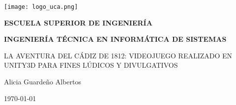 

\begin{titlepage}

  \begin{center}

    \texttt{[image: logo\_uca.png]} \\
    
    \vspace{2.0cm}
    
    \LARGE{\textbf{ESCUELA SUPERIOR DE INGENIERÍA}} \\
    
    \vspace{1.0cm}
    
    \Large{\textbf{INGENIERÍA TÉCNICA EN INFORMÁTICA DE SISTEMAS}} \\
    
    \vspace{3.0cm}
    
    \Large{LA AVENTURA DEL CÁDIZ DE 1812: VIDEOJUEGO REALIZADO EN UNITY3D PARA FINES LÚDICOS Y DIVULGATIVOS} \\
    
    \vspace{2.0cm}
    
    \Large{Alicia Guardeño Albertos} \\
  
    \vspace{0.5cm}

    \large{\today}
    
  \end{center}
\end{titlepage}
